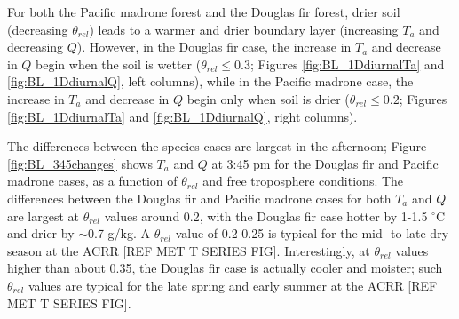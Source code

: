 
For both the Pacific madrone forest and the Douglas fir forest, drier soil (decreasing $\theta_{rel}$) leads to a warmer and drier boundary layer (increasing $T_a$ and decreasing $Q$).  However, in the Douglas fir case, the increase in $T_a$ and decrease in $Q$ begin when the soil is wetter ($\theta_{rel} \le 0.3$; Figures \ref{fig:BL_1DdiurnalTa} and \ref{fig:BL_1DdiurnalQ}, left columns), while in the Pacific madrone case, the increase in $T_a$ and decrease in $Q$ begin only when soil is drier ($\theta_{rel} \le 0.2$; Figures \ref{fig:BL_1DdiurnalTa} and \ref{fig:BL_1DdiurnalQ}, right columns).  

The differences between the species cases are largest in the afternoon; Figure \ref{fig:BL_345changes} shows $T_a$ and $Q$ at 3:45 pm for the Douglas fir and Pacific madrone cases, as a function of $\theta_{rel}$ and free troposphere conditions.  The differences between the Douglas fir and Pacific madrone cases for both $T_a$ and $Q$ are largest at $\theta_{rel}$ values around 0.2, with the Douglas fir case hotter by 1-1.5 $^\circ$C and drier by $\sim$0.7 g/kg.  A $\theta_{rel}$ value of 0.2-0.25 is typical for the mid- to late-dry-season at the ACRR [REF MET T SERIES FIG]. Interestingly, at $\theta_{rel}$ values higher than about 0.35, the Douglas fir case is actually cooler and moister; such $\theta_{rel}$ values are typical for the late spring and early summer at the ACRR [REF MET T SERIES FIG].

